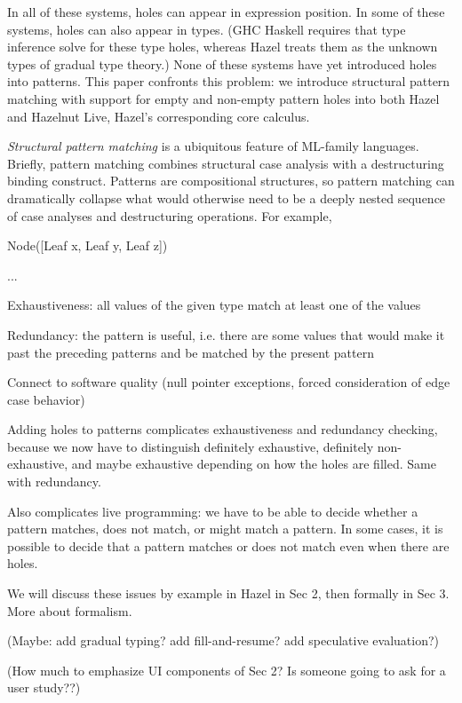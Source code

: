 In all of these systems, 
holes can appear in expression position.
In some of these systems, holes can also appear in types. (GHC Haskell requires that type inference solve for these type holes, whereas Hazel treats them as the unknown types of gradual type theory.)
None of these systems have yet introduced holes into patterns. 
This paper confronts this problem: we introduce structural pattern matching with support for empty and non-empty pattern holes into both Hazel and Hazelnut Live,
Hazel's corresponding core calculus.

\emph{Structural pattern matching} is a ubiquitous feature of ML-family languages. Briefly,
pattern matching combines structural case analysis with a destructuring binding construct. 
Patterns are compositional structures, so pattern matching can dramatically collapse what would otherwise 
need to be a deeply nested sequence of case analyses and destructuring operations. For example, 

Node([Leaf x, Leaf y, Leaf z])

...

Exhaustiveness: all values of the given type match at least one of the values

Redundancy: the pattern is useful, i.e. there are some values that would make it past the preceding patterns
and be matched by the present pattern

Connect to software quality (null pointer exceptions, forced consideration of edge case behavior)

Adding holes to patterns complicates exhaustiveness and redundancy checking, because we now have to distinguish definitely exhaustive, definitely non-exhaustive, and maybe exhaustive depending on how the holes are filled. Same with redundancy.

Also complicates live programming: we have to be able to decide whether a pattern matches, does not match, or might match a pattern. In some cases, it is possible to decide that a pattern matches or does not match even when there are holes. 

We will discuss these issues by example in Hazel in Sec 2, then formally in Sec 3. More about formalism. 

(Maybe: add gradual typing? add fill-and-resume? add speculative evaluation?)

(How much to emphasize UI components of Sec 2? Is someone going to ask for a user study??)